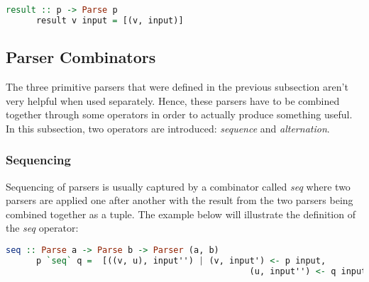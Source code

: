 \documentclass[a4paper, onecolumn]{article}
\begin{document}
    \begin{lstlisting}[language=Haskell]
      result :: p -> Parse p
      result v input = [(v, input)]
    \end{lstlisting}
    
    \subsection{Parser Combinators}
    
    The three primitive parsers that were defined in the previous subsection aren't very helpful when used separately. Hence, these parsers have to be combined together through some operators in order to actually produce something useful. In this subsection, two operators are introduced: \textit{sequence} and \textit{alternation}. 
    
    \subsubsection{Sequencing}
    
    Sequencing of parsers is usually captured by a combinator called \textit{seq} where two parsers are applied one after another with the result from the two parsers being combined together as a tuple. The example below will illustrate the definition of the \textit{seq} operator:
    
    \begin{tcolorbox}
    
    \begin{lstlisting}[language=Haskell]
      seq :: Parse a -> Parse b -> Parser (a, b)
      p `seq` q =  [((v, u), input'') | (v, input') <- p input,
                                                (u, input'') <- q input']
    \end{lstlisting}
    \end{tcolorbox}
    
\end{document}
